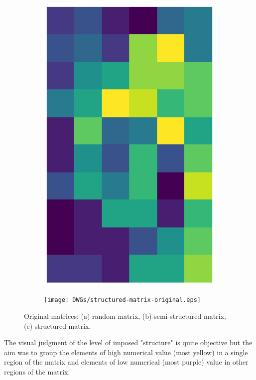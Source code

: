 \documentclass[10pt,twocolumn]{article}
\begin{document}
\begin{figure}[H]
\begin{subfigure}[t]{.15\textwidth}
\includegraphics[scale=.2]{DWGs/semi-structured-matrix-original.eps}
\caption{ }
\end{subfigure}
\begin{subfigure}[t]{.15\textwidth}
\centering
\texttt{[image: DWGs/structured-matrix-original.eps]}
\caption{ }
\end{subfigure}
\caption{Original matrices: (a) random matrix, (b) semi-structured matrix, (c) structured matrix.}
\label{fig:matrices}
\end{figure}

The visual judgment of the level of imposed "structure" is quite objective but the aim was to group the elements of high numerical value (most yellow) in a single region of the matrix and elements of low numerical (most purple) value in other regions of the matrix.
\end{document}
